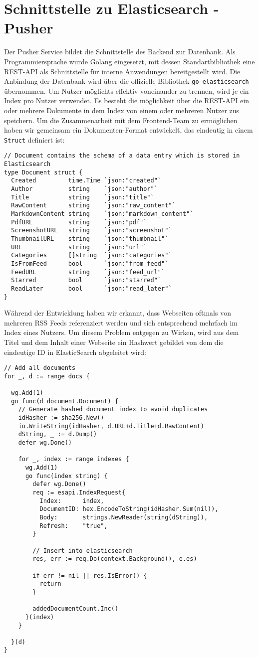 \section{Schnittstelle zu Elasticsearch - Pusher}
Der Pusher Service bildet die Schnittstelle des Backend zur Datenbank.
Als Programmiersprache wurde Golang \cite{go} eingesetzt, mit dessen Standartbibliothek eine REST-API als Schnittstelle für interne Anwendungen bereitgestellt wird.
Die Anbindung der Datenbank wird über die offizielle Bibliothek \texttt{go-elasticsearch}\cite{goes} übernommen.
Um Nutzer möglichts effektiv voneinander zu trennen, wird je ein Index pro Nutzer verwendet.
Es besteht die möglichkeit über die REST-API ein oder mehrere Dokumente in dem Index von einem oder mehreren Nutzer zus speichern.
Um die Zusammenarbeit mit dem Frontend-Team zu ermöglichen haben wir gemeinsam ein Dokumenten-Format entwickelt, das eindeutig in einem \texttt{Struct} definiert ist:
\begin{verbatim}
// Document contains the schema of a data entry which is stored in Elasticsearch
type Document struct {
  Created         time.Time `json:"created"`
  Author          string    `json:"author"`
  Title           string    `json:"title"`
  RawContent      string    `json:"raw_content"`
  MarkdownContent string    `json:"markdown_content"`
  PdfURL          string    `json:"pdf"`
  ScreenshotURL   string    `json:"screenshot"`
  ThumbnailURL    string    `json:"thumbnail"`
  URL             string    `json:"url"`
  Categories      []string  `json:"categories"`
  IsFromFeed      bool      `json:"from_feed"`
  FeedURL         string    `json:"feed_url"`
  Starred         bool      `json:"starred"`
  ReadLater       bool      `json:"read_later"`
}
\end{verbatim}
Während der Entwicklung haben wir erkannt, dass Webseiten oftmals von mehreren RSS Feeds referenziert werden und sich entsprechend mehrfach im Index eines Nutzers.
Um diesem Problem entgegen zu Wirken, wird aus dem Titel und dem Inhalt einer Webseite ein Hashwert gebildet von dem die eindeutige ID in ElasticSearch abgeleitet wird:
\begin{verbatim}
// Add all documents
for _, d := range docs {

  wg.Add(1)
  go func(d document.Document) {
    // Generate hashed document index to avoid duplicates
    idHasher := sha256.New()
    io.WriteString(idHasher, d.URL+d.Title+d.RawContent)
    dString, _ := d.Dump()
    defer wg.Done()

    for _, index := range indexes {
      wg.Add(1)
      go func(index string) {
        defer wg.Done()
        req := esapi.IndexRequest{
          Index:      index,
          DocumentID: hex.EncodeToString(idHasher.Sum(nil)),
          Body:       strings.NewReader(string(dString)),
          Refresh:    "true",
        }

        // Insert into elasticsearch
        res, err := req.Do(context.Background(), e.es)

        if err != nil || res.IsError() {
          return
        }

        addedDocumentCount.Inc()
      }(index)
    }

  }(d)
}
\end{verbatim}
